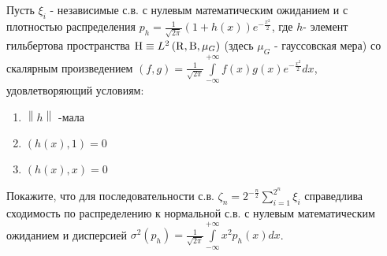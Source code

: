 \begin{comment}
\begin{problem}

Доказать локальную предельную теорему:

\noindent Пусть $0<p<1$ и $X_{i} $, $i=1,...,n$ - независимые случайные величины, имеющие распределение:
\[X_{i} =\left\{\begin{array}{cc} {1,} & {p,} \\ {-1,} & {q=1-p;} \end{array}\right. \] 
Тогда равномерно по всем $x=O\left(\sqrt{n} \right)$ таким, что $(p-q)n+x$ целое неотрицательное число
\[P\left\{\sum _{i=1}^{n}X_{i} =(p-q)n+x \right\}\sim \frac{1}{\sqrt{2\pi npq} } \exp \left\{-\frac{x^{2} }{2npq} \right\}\] 
при $n\to \infty $. 

\begin{ordre}
Воспользоваться формулой Стирлинга
\[
n! \sim \sqrt{2 \pi n} \frac{n^n}{e^n} 
\]
\end{ordre}

\begin{remark}
Пусть $n=2k$ и $p=\frac{1}{2} $, тогда вероятность того, что число единиц в точности рано числу минус единиц мало (но не экспоненциально мало):
\[P\left\{\sum _{i=1}^{2k}X_{i} =k \right\}\sim \frac{1}{\sqrt{\pi k} } \] 
\end{remark}

\end{problem}

\end{comment}


\begin{problem}

Пусть $\xi _i $ - независимые с.в. с нулевым математическим ожиданием и с 
плотностью распределения $p_h =\frac{1}{\sqrt {2\pi } }\left( {1+h(x)} 
\right)e^{-\frac{x^2}{2}}$, где $h$- элемент гильбертова пространства ${\rm 
H}\equiv L^2\left( {{\rm R},{\rm B},\mu _G } \right)$ (здесь $\mu _G $ - 
гауссовская мера) со скалярным произведением $\left( {f,g} 
\right)=\frac{1}{\sqrt {2\pi } }\int\limits_{-\infty }^{+\infty } 
{f(x)g(x)e^{-\frac{x^2}{2}}dx} $, удовлетворяющий условиям:

\begin{enumerate}
\item $\left\| h \right\|$ -мала

\item $\left( {h(x),1} \right)=0$

\item $\left( {h(x),x} \right)=0$

\end{enumerate}

Покажите, что для последовательности с.в. $\zeta _n 
=2^{-\frac{n}{2}}\sum\limits_{i=1}^{2^n} {\xi _i } $ справедлива сходимость 
по распределению к нормальной с.в. с нулевым математическим ожиданием и 
дисперсией $\sigma ^2(p_h )=\frac{1}{\sqrt {2\pi } }\int\limits_{-\infty 
}^{+\infty } {x^2p_h (x)dx} $.

\end{problem}


